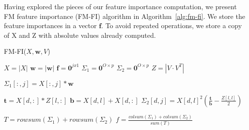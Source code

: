 \documentclass[10pt]{journal}
\begin{document}
Having explored the pieces of our feature importance computation, we present FM
feature importance (FM-FI) algorithm in Algorithm~\ref{alg:fm-fi}. We store the
feature importances in a vector $\bm{f}$. To avoid repeated operations, we store
a copy of X and Z with absolute values already computed.

\begin{algorithm}
    \caption{FM-FI($X, \bm{w}, V$)}
    \label{alg:fm-fi}
    \begin{algorithmic}[1]
        \State $X = |X|$  
        \State $\bm{w} = |\bm{w}|$
        \State $\bm{f} = \bm{0}^{j x 1}$
        \State $\Sigma_1 = \bm{0}^{O \times p}$
        \State $\Sigma_2 = \bm{0}^{O \times p}$
        \State $Z = |V \cdot V^T|$  
        \item[]
          
            \State $\Sigma_1[:,j] = X[:,j] * \bm{w}$
        \EndFor
        \item[]
          
                \State $\bm{t} = X[d,:] * Z[l,:]$
                \State $\bm{b} = X[d,l] + X[d,:]$
                \State $\Sigma_2[d,j] = X[d,l]^2
                    (\frac{\bm{t}}{\bm{b}} - \frac{Z[l,l]}{2})$
            \EndFor
        \EndFor
        \item[]
        \State $T = rowsum(\Sigma_1) + rowsum(\Sigma_2)$
        \State $f = \frac{colsum(\Sigma_1) + colsum(\Sigma_2)}{sum(T)}$

    \end{algorithmic}
\end{algorithm}




\end{document}
